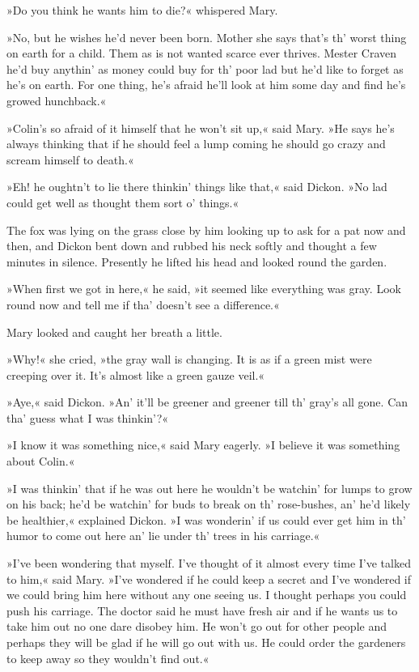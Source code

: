 »Do you think he wants him to die?« whispered Mary.

»No, but he wishes he'd never been born. Mother she says that's th' worst thing on earth for a child. Them as is not wanted scarce ever thrives. Mester Craven he'd buy anythin' as money could buy for th' poor lad but he'd like to forget as he's on earth. For one thing, he's afraid he'll look at him some day and find he's growed hunchback.«

»Colin's so afraid of it himself that he won't sit up,« said Mary. »He says he's always thinking that if he should feel a lump coming he should go crazy and scream himself to death.«

»Eh! he oughtn't to lie there thinkin' things like that,« said Dickon. »No lad could get well as thought them sort o' things.«

The fox was lying on the grass close by him looking up to ask for a pat now and then, and Dickon bent down and rubbed his neck softly and thought a few minutes in silence. Presently he lifted his head and looked round the garden.

»When first we got in here,« he said, »it seemed like everything was gray. Look round now and tell me if tha' doesn't see a difference.«

Mary looked and caught her breath a little.

»Why!« she cried, »the gray wall is changing. It is as if a green mist were creeping over it. It's almost like a green gauze veil.«

»Aye,« said Dickon. »An' it'll be greener and greener till th' gray's all gone. Can tha' guess what I was thinkin'?«

»I know it was something nice,« said Mary eagerly. »I believe it was something about Colin.«

»I was thinkin' that if he was out here he wouldn't be watchin' for lumps to grow on his back; he'd be watchin' for buds to break on th' rose-bushes, an' he'd likely be healthier,« explained Dickon. »I was wonderin' if us could ever get him in th' humor to come out here an' lie under th' trees in his carriage.«

»I've been wondering that myself. I've thought of it almost every time I've talked to him,« said Mary. »I've wondered if he could keep a secret and I've wondered if we could bring him here without any one seeing us. I thought perhaps you could push his carriage. The doctor said he must have fresh air and if he wants us to take him out no one dare disobey him. He won't go out for other people and perhaps they will be glad if he will go out with us. He could order the gardeners to keep away so they wouldn't find out.«

